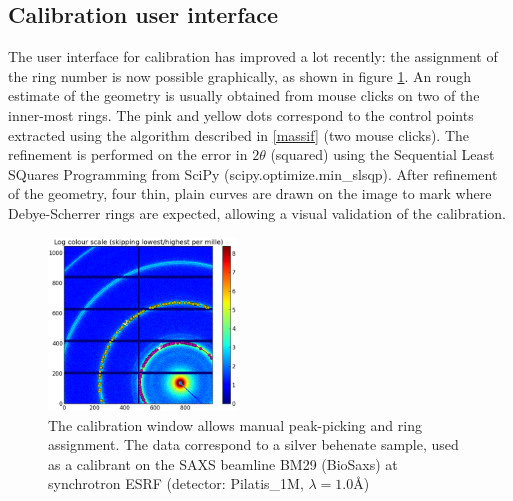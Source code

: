 \documentclass[preprint]{iucr}
\begin{document}
\subsection{Calibration user interface}

The user interface for calibration has improved a lot recently: the assignment
of the ring number is now possible graphically, as shown in figure \ref{calib}.
An rough estimate of the geometry is usually obtained from mouse clicks on 
two of the inner-most rings. 
The pink and yellow dots correspond to the control points extracted using
the algorithm described in \ref{massif} (two mouse clicks).
The refinement is performed on the error in $2\theta$ (squared) using the 
Sequential Least SQuares Programming  from
SciPy (scipy.optimize.min_slsqp).
After refinement of the geometry, four thin, plain curves are drawn on the image
to mark where Debye-Scherrer rings are expected, allowing a visual validation of
the calibration. 

\begin{figure}
\label{calib}
\begin{center}
\includegraphics[width=5cm]{calib.eps}
\caption{The calibration window allows manual peak-picking and
ring assignment. The data correspond to a silver behenate sample, used as a
calibrant on the SAXS beamline BM29 (BioSaxs) at synchrotron ESRF
(detector: Pilatis_1M, $\lambda=1.0${\AA})}
\end{center}
\end{figure}
\end{document}
